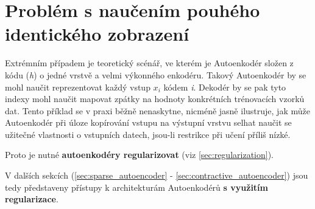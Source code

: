 \section{Problém s naučením pouhého identického zobrazení}
\label{sec:identity}
Extrémním případem je teoretický scénář, ve kterém je Autoenkodér složen z kódu (\emph{h}) o jedné vrstvě a velmi výkonného enkodéru.
Takový Autoenkodér by se mohl naučit reprezentovat každý vstup $x_i$ kódem \emph{i}.
Dekodér by se pak tyto indexy mohl naučit mapovat zpátky na hodnoty konkrétních trénovacích vzorků dat.
Tento příklad se v praxi běžně nenaskytne, nicméně jasně ilustruje,
jak může Autoenkodér při úloze kopírování vstupu na výstupní vrstvu selhat naučit se užitečné vlastnosti o vstupních datech, jsou-li restrikce při učení příliš nízké. \cite{Goodfellow2016}

Proto je nutné \textbf{autoenkodéry regularizovat} (viz \autoref{sec:regularization}).

V dalších sekcích (\autoref{sec:sparse_autoencoder} - \autoref{sec:contractive_autoencoder}) jsou tedy představeny přístupy k architekturám Autoenkodérů \textbf{s využitím regularizace}.